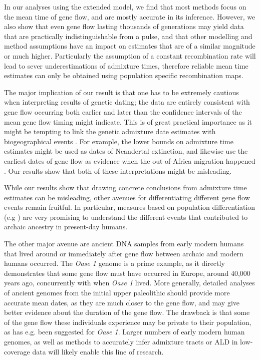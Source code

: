 \documentclass[]{article}
\begin{document}
In our analyses using the extended model, we find that most methods focus on the mean time of gene flow, and are mostly accurate in its inference. However, we also show that even gene flow lasting thousands of generations may yield data that are practically indistinguishable from a pulse, and that other modelling and method assumptions have an impact on estimates that are of a similar magnitude or much higher. Particularly the assumption of a constant recombination rate will lead to sever underestimations of admixture times, therefore reliable mean time estimates can only be obtained using population specific recombination maps.

The major implication of our result is that one has to be extremely cautious when interpreting results of genetic dating; the data are entirely consistent with gene flow occurring both earlier and later than the confidence intervals of the mean gene flow timing might indicate. This is of great practical importance as it might be tempting to link the genetic admixture date estimates with biogeographical events \citep{sankararaman_date_2012,lazaridis_genomic_2016,jacobs_multiple_2019,vyas_analyses_2019,douka_age_2019}. For example, the lower bounds on admixture time estimates might be used as dates of Neandertal extinction, and likewise use the earliest dates of gene flow as evidence when the out-of-Africa migration happened \citep{sankararaman_date_2012}. Our results show that both of these interpretations might be misleading.


While our results show that drawing concrete conclusions from admixture time estimates can be misleading, other avenues for differentiating different gene flow events remain fruitful.
In particular, measures based on population differentiation (e.g \citep{browning_analysis_2018,wall_higher_2013,villanea_multiple_2019,jacobs_multiple_2019}) are very promising to understand the different events that contributed to archaic ancestry in present-day humans. 

The other major avenue are ancient DNA samples from early modern humans that lived around or immediately after gene flow between archaic and modern humans occurred. The \textit{Oase 1} \citep{fu_genome_2014} genome is a prime example, as it directly demonstrates that some gene flow must have occurred in Europe, around 40,000 years ago, concurrently with when \textit{Oase 1} lived. More generally, detailed analyses of ancient genomes from the initial upper paleolithic should provide more accurate mean dates, as they are much closer to the gene flow, and may give better evidence about the duration of the gene flow. The drawback is that some of the gene flow these individuals experience may be private to their population, as has e.g. been suggested for \textit{Oase 1}. Larger numbers of early modern human genomes, as well as methods to accurately infer admixture tracts or ALD in low-coverage data will likely enable this line of research. 
\end{document}
